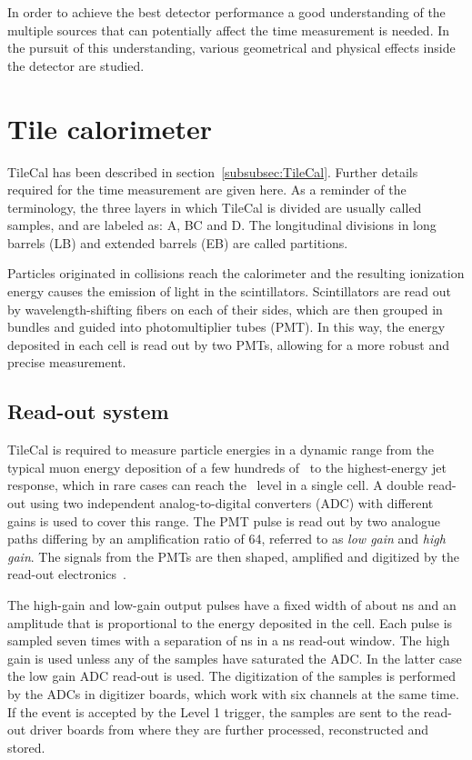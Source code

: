 In order to achieve the best detector performance a good
understanding of the multiple sources that can potentially affect the
time measurement is needed.
In the pursuit of this understanding,
various geometrical and physical effects inside the detector are
studied.

\section{Tile calorimeter}
\label{sec:tilecal_timing}

TileCal has been described in section~\ref{subsubsec:TileCal}. 
Further details required for the time measurement are given here.
As a reminder of the terminology, the three layers in which TileCal is divided are usually called samples, and are labeled as: A, BC and D. The longitudinal divisions in long barrels (LB) and extended barrels (EB) are called partitions.

Particles originated in collisions reach the calorimeter and the resulting ionization energy causes the emission of light in the scintillators.
Scintillators are read out by wavelength-shifting fibers on each of their sides, which are then grouped in bundles and guided into photomultiplier tubes (PMT).
In this way, the energy deposited in each cell is read out by two PMTs, allowing for a more robust and precise measurement.

\subsection{Read-out system}
TileCal is required to measure particle energies in a dynamic range from the typical muon energy deposition of a few hundreds of \mev\ to the highest-energy jet response, which in rare cases can reach the \tev\ level in a single cell.
A double read-out using two independent analog-to-digital converters
(ADC) with different gains is used to cover this range.
The PMT pulse is read out by two analogue paths differing by an amplification ratio
of 64, referred to as \textit{low gain} and \textit{high gain}.
The signals from the PMTs are then shaped, amplified and digitized by the read-out
electronics~\cite{signal_reconstruction}.

The high-gain and low-gain output pulses have a fixed width of about \unit[50]{ns} and an amplitude that is proportional to the energy deposited in the cell.
Each pulse is sampled seven times with a separation of \unit[25]{ns} in a \unit[150]{ns} read-out window.
The high gain is used unless any of the samples have saturated the ADC.
In the latter case the low gain ADC read-out is used.
The digitization of the samples is performed by the ADCs in digitizer boards, which work with six channels at the same time.
If the event is accepted by the Level 1 trigger, the samples are sent to the read-out driver boards from where they are further processed, reconstructed and stored.

